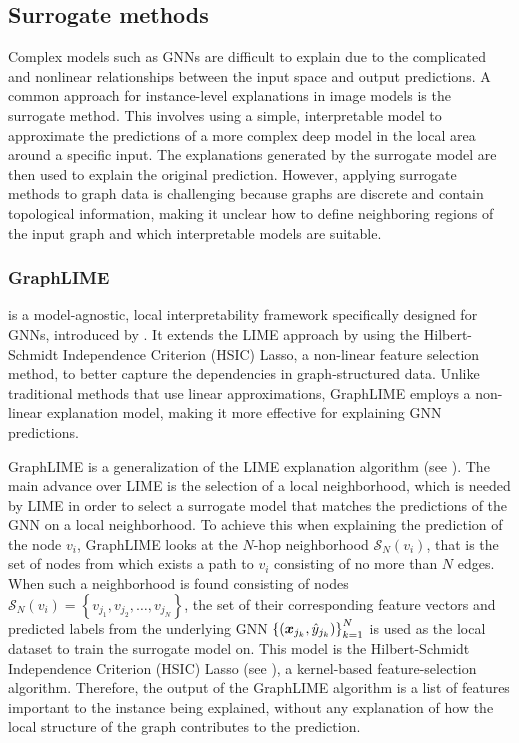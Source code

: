 \subsection{Surrogate methods}

Complex models such as GNNs are difficult to explain due to the complicated and nonlinear relationships between the input space and output predictions. A common approach for instance-level explanations in image models is the surrogate method. This involves using a simple, interpretable model to approximate the predictions of a more complex deep model in the local area around a specific input. The explanations generated by the surrogate model are then used to explain the original prediction. However, applying surrogate methods to graph data is challenging because graphs are discrete and contain topological information, making it unclear how to define neighboring regions of the input graph and which interpretable models are suitable.

\subsubsection{GraphLIME}

 is a model-agnostic, local interpretability framework specifically designed for GNNs, introduced by \cite{huang_graphlime_2023}. It extends the LIME approach by using the Hilbert-Schmidt Independence Criterion (HSIC) Lasso, a non-linear feature selection method, to better capture the dependencies in graph-structured data. Unlike traditional methods that use linear approximations, GraphLIME employs a non-linear explanation model, making it more effective for explaining GNN predictions.

GraphLIME is a generalization of the LIME explanation algorithm (see \cite{ribeiro_why_2016}). The main advance over LIME is the selection of a local neighborhood, which is needed by LIME in order to select a surrogate model that matches the predictions of the GNN on a local neighborhood. To achieve this when explaining the prediction of the node \( v_i \), GraphLIME looks at the \( N \)-hop neighborhood \( \mathcal{S}_N \left( v_i \right) \), that is the set of nodes from which exists a path to \( v_i \) consisting of no more than \( N \) edges. When such a neighborhood is found consisting of nodes \( \mathcal{S}_N \left( v_i \right) = \left\{ v_{j_1}, v_{j_2}, \dots, v_{j_N} \right\} \), the set of their corresponding feature vectors and predicted labels from the underlying GNN \( \left\{ \left( \bm{x}_{j_k}, \hat{y}_{j_k} \right) \right\}_{k=1}^{N} \) is used as the local dataset to train the surrogate model on. This model is the Hilbert-Schmidt Independence Criterion (HSIC) Lasso (see \cite{yamada_high-dimensional_2014}), a kernel-based feature-selection algorithm. Therefore, the output of the GraphLIME algorithm is a list of features important to the instance being explained, without any explanation of how the local structure of the graph contributes to the prediction.

